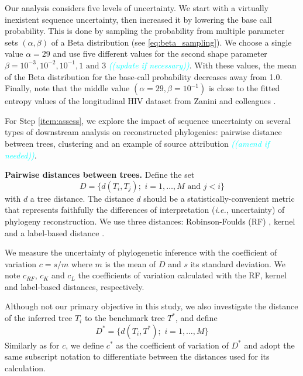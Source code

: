 \documentclass[10pt]{article}
\newcommand{\comment}[1]{\textsl{\textcolor{cyan}{((#1))}}}
\newcommand{\ie}{\textit{i.e.},\xspace}
\begin{document}
Our analysis considers five levels of uncertainty. We start with a virtually inexistent sequence uncertainty, then increased it by lowering the base call probability. This is done by sampling the probability from multiple parameter sets $(\alpha,\beta)$ of a Beta distribution (see \autoref{eq:beta_sampling}). 
We choose a single value $\alpha=29$ and use five different values for the second shape parameter $\beta = 10^{-3}, 10^{-2}, 10^{-1}, 1 \text{ and } 3$ \comment{update if necessary}.
With these values, the mean of the Beta distribution for the base-call probability decreases away from 1.0. 
Finally, note that the middle value $(\alpha=29, \beta=10^{-1})$ is close to the fitted entropy values of the longitudinal HIV dataset from Zanini and colleagues \cite{Zanini:2015}.

For Step \ref{item:assess}, we explore the impact of sequence uncertainty on several types of downstream analysis on reconstructed phylogenies: pairwise distance between trees, clustering and an example of source attribution \comment{amend if needed}.


\textbf{Pairwise distances between trees.}
Define the set 
\begin{equation}
D = \{d(T_i,T_j);\,\, i=1,\ldots, M \text{ and } j<i \}
\end{equation}
with $d$ a tree distance. 
The distance $d$ should be a statistically-convenient metric that represents faithfully the differences of interpretation (\ie uncertainty) of phylogeny reconstruction. 
We use three distances:  Robinson-Foulds (RF) \cite{Robinson:1981}, kernel \cite{Poon:2013} and a label-based distance \cite{xxx}. 

We measure the uncertainty of phylogenetic inference with the coefficient of variation $c = s / m$ where $m$ is the mean of $D$ and $s$ its standard deviation.
We note $c_{RF}$, $c_K$ and $c_{L}$ the coefficients of variation calculated with the RF, kernel and label-based distances, respectively.

Although not our primary objective in this study, we also investigate the distance of the inferred tree $T_i$ to the benchmark tree $T^*$, and define 
\begin{equation}
D^* = \{d(T_i,T^*);\,\, i=1,\ldots, M \} 
\end{equation}
Similarly as for $c$, we define $c^*$ as the coefficient of variation of $D^*$ and adopt the same subscript notation to differentiate between the distances used for its calculation.
\end{document}
